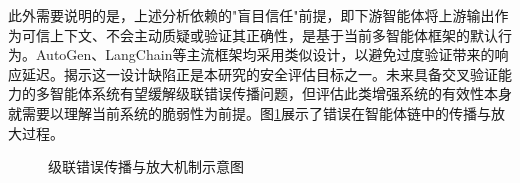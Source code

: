 此外需要说明的是，上述分析依赖的"盲目信任"前提，即下游智能体将上游输出作为可信上下文、不会主动质疑或验证其正确性，是基于当前多智能体框架的默认行为。AutoGen、LangChain等主流框架均采用类似设计，以避免过度验证带来的响应延迟。揭示这一设计缺陷正是本研究的安全评估目标之一。未来具备交叉验证能力的多智能体系统有望缓解级联错误传播问题，但评估此类增强系统的有效性本身就需要以理解当前系统的脆弱性为前提。图\ref{fig:cascade_propagation}展示了错误在智能体链中的传播与放大过程。

\begin{figure}[htbp]
\centering
{}
\caption{级联错误传播与放大机制示意图}
\label{fig:cascade_propagation}
\end{figure}
